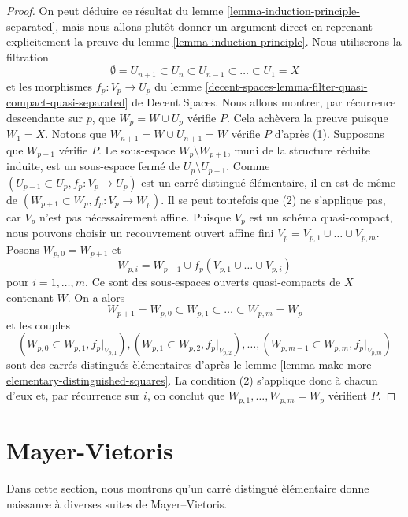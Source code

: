 \begin{proof}
On peut d\'eduire ce r\'esultat du
lemme \ref{lemma-induction-principle-separated}, mais nous allons plut\^ot
donner un argument direct en reprenant explicitement la preuve du
lemme \ref{lemma-induction-principle}. Nous utiliserons la filtration
$$
\emptyset = U_{n + 1} \subset
U_n \subset U_{n - 1} \subset \ldots \subset U_1 = X
$$
et les morphismes $f_p : V_p \to U_p$ du lemme
\ref{decent-spaces-lemma-filter-quasi-compact-quasi-separated} de
Decent Spaces. Nous allons montrer, par r\'ecurrence descendante sur $p$,
que $W_p = W \cup U_p$ v\'erifie $P$. Cela ach\`evera la preuve puisque
$W_1 = X$. Notons que $W_{n + 1} = W \cup U_{n + 1} = W$ v\'erifie $P$
d'apr\`es (1). Supposons que $W_{p + 1}$ v\'erifie $P$. Le sous-espace
$W_p \setminus W_{p + 1}$, muni de la structure r\'eduite induite, est un
sous-espace ferm\'e de $U_p \setminus U_{p + 1}$.
Comme $(U_{p + 1} \subset U_p, f_p : V_p \to U_p)$ est un carr\'e distingu\'e
\'el\'ementaire, il en est de m\^eme de
$(W_{p + 1} \subset W_p, f_p : V_p \to W_p)$.
Il se peut toutefois que (2) ne s'applique pas, car $V_p$ n'est pas
n\'ecessairement affine. Puisque $V_p$ est un sch\'ema quasi-compact, nous
pouvons choisir un recouvrement ouvert affine fini
$V_p = V_{p, 1} \cup \ldots \cup V_{p, m}$. Posons
$W_{p, 0} = W_{p + 1}$ et
$$
W_{p, i} = W_{p + 1} \cup f_p(V_{p, 1} \cup \ldots \cup V_{p, i})
$$
pour $i = 1, \ldots, m$. Ce sont des sous-espaces ouverts quasi-compacts
de $X$ contenant $W$. On a alors
$$
W_{p + 1} = W_{p, 0} \subset
W_{p, 1} \subset \ldots \subset
W_{p, m} = W_p
$$
et les couples
$$
(W_{p, 0} \subset W_{p, 1}, f_p|_{V_{p, 1}}),
(W_{p, 1} \subset W_{p, 2}, f_p|_{V_{p, 2}}),\ldots,
(W_{p, m - 1} \subset W_{p, m}, f_p|_{V_{p, m}})
$$
sont des carr\'es distingu\'es \`el\'ementaires d'apr\`es le
lemme \ref{lemma-make-more-elementary-distinguished-squares}.
La condition (2) s'applique donc \`a chacun d'eux et, par r\'ecurrence sur
$i$, on conclut que $W_{p, 1}, \ldots, W_{p, m} = W_p$ v\'erifient $P$.
\end{proof}



\section{Mayer-Vietoris}
\label{section-mayer-vietoris}

\noindent
Dans cette section, nous montrons qu'un carr\'e distingu\'e \`el\'ementaire
donne naissance \`a diverses suites de Mayer--Vietoris.

